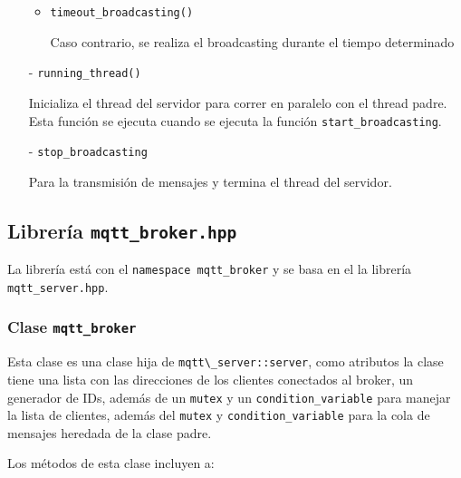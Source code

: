 \begin{itemize}
\begin{itemize}
        \item \verb|timeout_broadcasting()|
        
        Caso contrario, se realiza el broadcasting durante el tiempo determinado
    \end{itemize}
    
    \item[-] \verb|running_thread()|
    
    Inicializa el thread del servidor para correr en paralelo con el thread padre. Esta función  se ejecuta cuando se ejecuta la función \verb|start_broadcasting|.

    \item[-] \verb|stop_broadcasting|
    
    Para la transmisión de mensajes y termina el thread del servidor.

\end{itemize}

\subsection{Librería \texttt{mqtt\_broker.hpp}}

La librería está con el \texttt{namespace mqtt\_broker} y se basa en el la librería \texttt{mqtt\_server.hpp}.

\subsubsection{Clase \texttt{mqtt\_broker}}
Esta clase es una clase hija de \verb|mqtt\_server::server|, como atributos la clase tiene una lista con las direcciones de los clientes conectados al broker, un generador de IDs, además de un \verb|mutex| y un \verb|condition_variable| para manejar la lista de clientes, además del \verb|mutex| y \verb|condition_variable| para la cola de mensajes heredada  de la clase padre.

Los métodos de esta clase incluyen a:


